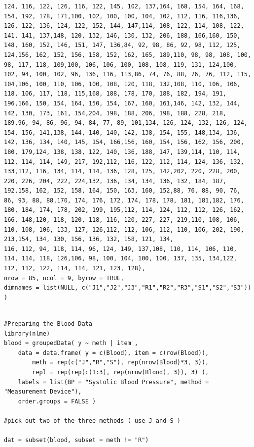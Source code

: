 \documentclass[12pt, a4paper]{report}
\theoremstyle{plain}
\theoremstyle{definition}
\theoremstyle{remark}
\begin{document}
\begin{framed}
\begin{verbatim}
124, 116, 122, 126, 116, 122, 145, 102, 137,164, 168, 154, 164, 168, 154, 192, 178, 171,100, 102, 100, 100, 104, 102, 112, 116, 116,136, 126, 122, 136, 124, 122, 152, 144, 147,114, 108, 122, 114, 108, 122, 141, 141, 137,148, 120, 132, 146, 130, 132, 206, 188, 166,160, 150, 148, 160, 152, 146, 151, 147, 136,84, 92, 98, 86, 92, 98, 112, 125, 124,156, 162, 152, 156, 158, 152, 162, 165, 189,110, 98, 98, 108, 100, 98, 117, 118, 109,100, 106, 106, 100, 108, 108, 119, 131, 124,100, 102, 94, 100, 102, 96, 136, 116, 113,86, 74, 76, 88, 76, 76, 112, 115, 104,106, 100, 110, 106, 100, 108, 120, 118, 132,108, 110, 106, 106, 118, 106, 117, 118, 115,168, 188, 178, 170, 188, 182, 194, 191, 196,166, 150, 154, 164, 150, 154, 167, 160, 161,146, 142, 132, 144, 142, 130, 173, 161, 154,204, 198, 188, 206, 198, 188, 228, 218, 189,96, 94, 86, 96, 94, 84, 77, 89, 101,134, 126, 124, 132, 126, 124, 154, 156, 141,138, 144, 140, 140, 142, 138, 154, 155, 148,134, 136, 142, 136, 134, 140, 145, 154, 166,156, 160, 154, 156, 162, 156, 200, 180, 179,124, 138, 138, 122, 140, 136, 188, 147, 139,114, 110, 114, 112, 114, 114, 149, 217, 192,112, 116, 122, 112, 114, 124, 136, 132, 133,112, 116, 134, 114, 114, 136, 128, 125, 142,202, 220, 228, 200, 220, 226, 204, 222, 224,132, 136, 134, 134, 136, 132, 184, 187, 192,158, 162, 152, 158, 164, 150, 163, 160, 152,88, 76, 88, 90, 76, 86, 93, 88, 88,170, 174, 176, 172, 174, 178, 178, 181, 181,182, 176, 180, 184, 174, 178, 202, 199, 195,112, 114, 124, 112, 112, 126, 162, 166, 148,120, 118, 120, 118, 116, 120, 227, 227, 219,110, 108, 106, 110, 108, 106, 133, 127, 126,112, 112, 106, 112, 110, 106, 202, 190, 213,154, 134, 130, 156, 136, 132, 158, 121, 134,
116, 112, 94, 118, 114, 96, 124, 149, 137,108, 110, 114, 106, 110, 114, 114, 118, 126,106, 98, 100, 104, 100, 100, 137, 135, 134,122, 112, 112, 122, 114, 114, 121, 123, 128), 
nrow = 85, ncol = 9, byrow = TRUE,
dimnames = list(NULL, c("J1","J2","J3","R1","R2","R3","S1","S2","S3")) )
\end{verbatim}
\end{framed}
\begin{framed}
\begin{verbatim}

#Preparing the Blood Data
library(nlme)
blood = groupedData( y ~ meth | item ,
    data = data.frame( y = c(Blood), item = c(row(Blood)),
        meth = rep(c("J","R","S"), rep(nrow(Blood)*3, 3)),
        repl = rep(rep(c(1:3), rep(nrow(Blood), 3)), 3) ),
    labels = list(BP = "Systolic Blood Pressure", method = "Measurement Device"),
    order.groups = FALSE )
 
#pick out two of the three methods ( use J and S ) 
   
dat = subset(blood, subset = meth != "R")
\end{verbatim}
\end{framed}
\end{document}
